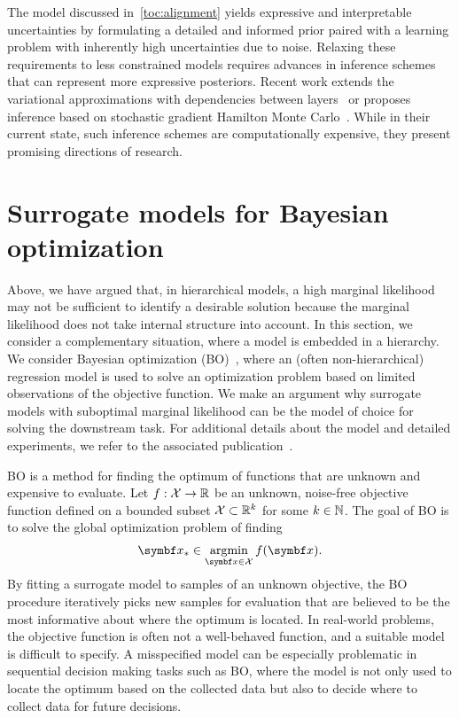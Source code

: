 The model discussed in~\cref{toc:alignment} yields expressive and interpretable uncertainties by formulating a detailed and informed prior paired with a learning problem with inherently high uncertainties due to noise.
Relaxing these requirements to less constrained models requires advances in inference schemes that can represent more expressive posteriors.
Recent work extends the variational approximations with dependencies between layers~\parencite{ustyuzhaninov_compositional_2020} or proposes inference based on stochastic gradient Hamilton Monte Carlo~\parencite{havasi_inference_2018}.
While in their current state, such inference schemes are computationally expensive, they present promising directions of research.

\section{Surrogate models for Bayesian optimization}
\label{toc:discussion:bo}
Above, we have argued that, in hierarchical models, a high marginal likelihood may not be sufficient to identify a desirable solution because the marginal likelihood does not take internal structure into account.
In this section, we consider a complementary situation, where a model is embedded in a hierarchy.
We consider Bayesian optimization (BO)~\parencite{snoek_practical_2012}, where an (often non-hierarchical) regression model is used to solve an optimization problem based on limited observations of the objective function.
We make an argument why surrogate models with suboptimal marginal likelihood can be the model of choice for solving the downstream task.
For additional details about the model and detailed experiments, we refer to the associated publication~\parencite{bodin_modulating_2020}.

BO is a method for finding the optimum of functions that are unknown and expensive to evaluate.
Let $f : \mathcal{X} \to \mathbb{R}$ be an unknown, noise-free objective function defined on a bounded subset $\mathcal{X} \subset \mathbb{R}^k$ for some $k \in \mathbb{N}$.
The goal of BO is to solve the global optimization problem of finding
\begin{align}
    \mat{x}_\ast \in \argmin_{\mat{x} \in \Xc} f(\mat{x}).
\end{align}
By fitting a surrogate model to samples of an unknown objective, the BO procedure iteratively picks new samples for evaluation that are believed to be the most informative about where the optimum is located.
In real-world problems, the objective function is often not a well-behaved function, and a suitable model is difficult to specify.
A misspecified model can be especially problematic in sequential decision making tasks such as BO, where the model is not only used to locate the optimum based on the collected data but also to decide where to collect data for future decisions.

